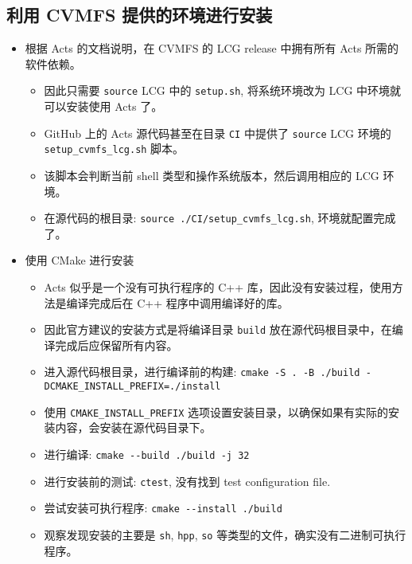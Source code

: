 \subsection{利用 CVMFS 提供的环境进行安装}
\begin{itemize}
	\item 根据 Acts 的文档说明，在 CVMFS 的 LCG release 中拥有所有 Acts 所需的软件依赖。
	\begin{itemize}
		\item 因此只需要 \verb|source| LCG 中的 \verb|setup.sh|, 将系统环境改为 LCG 中环境就可以安装使用 Acts 了。
		\item GitHub 上的 Acts 源代码甚至在目录 \verb|CI| 中提供了 \verb|source| LCG 环境的 \verb|setup_cvmfs_lcg.sh| 脚本。
		\item 该脚本会判断当前 shell 类型和操作系统版本，然后调用相应的 LCG 环境。
		\item 在源代码的根目录: \verb|source ./CI/setup_cvmfs_lcg.sh|, 环境就配置完成了。
	\end{itemize}
	\item 使用 CMake 进行安装
	\begin{itemize}
		\item Acts 似乎是一个没有可执行程序的 C++ 库，因此没有安装过程，使用方法是编译完成后在 C++ 程序中调用编译好的库。
		\item 因此官方建议的安装方式是将编译目录 \verb|build| 放在源代码根目录中，在编译完成后应保留所有内容。
		\item 进入源代码根目录，进行编译前的构建: \verb|cmake -S . -B ./build -DCMAKE_INSTALL_PREFIX=./install|
		\item 使用 \verb|CMAKE_INSTALL_PREFIX| 选项设置安装目录，以确保如果有实际的安装内容，会安装在源代码目录下。
		\item 进行编译: \verb|cmake --build ./build -j 32|
		\item 进行安装前的测试: \verb|ctest|, 没有找到 test configuration file.
		\item 尝试安装可执行程序: \verb|cmake --install ./build|
		\item 观察发现安装的主要是 \verb|sh|, \verb|hpp|, \verb|so| 等类型的文件，确实没有二进制可执行程序。
	\end{itemize}
\end{itemize}

